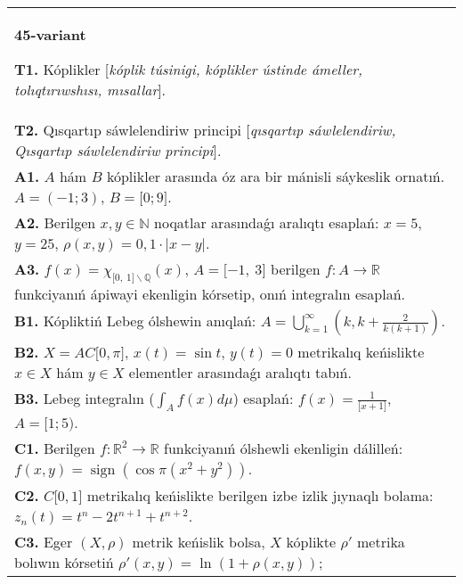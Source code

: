 \documentclass{article}
\DeclareMathOperator{\sign}{sign}
\begin{document}
\begin{tabular}{m{17cm}}
\textbf{45-variant}
\newline

\textbf{T1.} Kóplikler [\textit{kóplik túsinigi, kóplikler ústinde ámeller, tolıqtırıwshısı, mısallar}]. \\
\textbf{T2.} Qısqartıp sáwlelendiriw principi [\textit{qısqartıp sáwlelendiriw, Qısqartıp sáwlelendiriw principi}]. \\
\textbf{A1.} \(A\) hám \(B\) kóplikler arasında óz ara bir mánisli sáykeslik ornatıń. \(A = ( - 1;3)\), \(B = \lbrack 0;9\rbrack\). \\
\textbf{A2.} Berilgen \(x,y\mathbb{\in N}\) noqatlar arasındaǵı aralıqtı esaplań: \(x = 5\), \(y = 25\), \(\rho(x,y) = 0,1 \cdot |x - y|\). \\
\textbf{A3.} \(f(x) = \chi_{\lbrack 0,\ 1\rbrack\backslash\mathbb{Q}}(x)\), \(A = \lbrack - 1,\ 3\rbrack\) berilgen \(f:A\rightarrow\mathbb{R}\) funkciyanıń ápiwayi ekenligin kórsetip, onıń integralın esaplań. \\
\textbf{B1.} Kópliktiń Lebeg ólshewin anıqlań: \(A = \bigcup_{k = 1}^{\infty}\left( k,k + \frac{2}{k(k + 1)} \right)\). \\
\textbf{B2.} \(X = AC\lbrack 0,\pi\rbrack\), \(x(t) = \sin t\), \(y(t) = 0\) metrikalıq keńislikte \(x \in X\) hám \(y \in X\) elementler arasındaǵı aralıqtı tabıń. \\
\textbf{B3.} Lebeg integralın (\(\int_{A}^{}{f(x)d\mu}\)) esaplań: \(f(x) = \frac{1}{\lbrack x + 1\rbrack}\), \(A = \lbrack 1;5)\). \\
\textbf{C1.} Berilgen \(f:\mathbb{R}^{2}\mathbb{\rightarrow R}\) funkciyanıń ólshewli ekenligin dálilleń: \(f(x,y) = \sign\left( \cos\pi\left( x^{2} + y^{2} \right) \right)\). \\
\textbf{C2.} \(C\lbrack 0,1\rbrack\) metrikalıq keńislikte berilgen izbe izlik jıynaqlı bolama: \(z_{n}(t) = t^{n} - 2t^{n + 1} + t^{n + 2}\). \\
\textbf{C3.} Eger \((X,\rho)\) metrik keńislik bolsa, \(X\) kóplikte \(\rho'\) metrika bolıwın kórsetiń \(\rho'(x,y) = \ln\left( 1 + \rho(x,y) \right)\); \\

\end{tabular}
\vspace{1cm}
\end{document}
